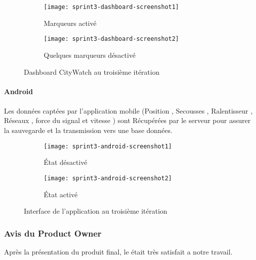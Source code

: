 \begin{figure}[htbp]
    \begin{subfigure}{.5\textwidth}
    \centering
  \centering
  \texttt{[image: sprint3-dashboard-screenshot1]}
  \caption{Marqueurs activé}
  \label{fig:sprint3-dashboard-screenshot1}
\end{subfigure}
\begin{subfigure}{.5\textwidth}
    \centering
  \centering
  \texttt{[image: sprint3-dashboard-screenshot2]}
  \caption{Quelques marqueurs désactivé}
  \label{sprint3-dashboard-screenshot2}
\end{subfigure}
\caption{Dashboard CityWatch au troisième itération}
\end{figure}
\clearpage

\paragraph{Android}
\paragraph*{}
Les données captées par l'application mobile (Position , Secousses , Ralentisseur , Réseaux , force du 
signal et vitesse ) sont Récupérées par le serveur pour assurer la sauvegarde et la transmission vers une 
base données.\\

\begin{figure}[htbp]
\centering
    \begin{subfigure}{.3\textwidth}
    \centering
  \centering
  \texttt{[image: sprint3-android-screenshot1]}
  \caption{État désactivé}
  \label{fig:sprint3-android-screenshot1}
\end{subfigure}
\begin{subfigure}{.3\textwidth}
    \centering
  \centering
  \texttt{[image: sprint3-android-screenshot2]}
  \caption{État activé}
  \label{fig:sprint3-android-screenshot2}
\end{subfigure}
\caption{Interface de l'application au troisième itération}
\end{figure}
\clearpage

\subsubsection{Avis du Product Owner}

Après la présentation du produit final, le  était très satisfait
a notre travail.

